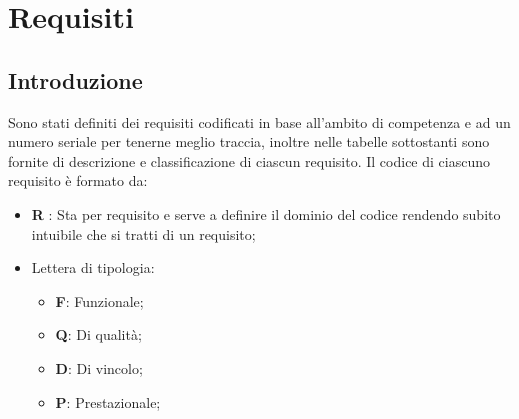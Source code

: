 
\section{Requisiti}
\subsection{Introduzione}
Sono stati definiti dei requisiti codificati in base all’ambito di competenza e ad un numero seriale per
tenerne meglio traccia, inoltre nelle tabelle sottostanti sono fornite di descrizione e classificazione di ciascun
requisito. Il codice di ciascuno requisito è formato da:
\begin{itemize}
    \item \textbf{R} : Sta per requisito e serve a definire il dominio del codice rendendo subito intuibile che si tratti di
    un requisito;
    \item Lettera di tipologia:
    \begin{itemize}
        \item \textbf{F}: Funzionale;
        \item \textbf{Q}: Di qualità;
        \item \textbf{D}: Di vincolo;
        \item \textbf{P}: Prestazionale;
    \end{itemize}
\end{itemize}

